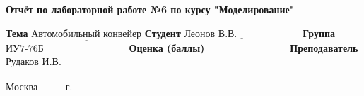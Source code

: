 \begin{titlepage}
	
	\begin{center}
		\Large\textbf{Отчёт по лабораторной работе №6 \newline по курсу "Моделирование"}\newline
	\end{center}
	
	\noindent\textbf{Тема} $\underline{\text{Автомобильный конвейер}}$\newline\newline\newline
	\noindent\textbf{Студент} $\underline{\text{Леонов В.В.~~~~~~~~~~~~~~~~~~~}}$\newline\newline
	\noindent\textbf{Группа} $\underline{\text{ИУ7-76Б~~~~~~~~~~~~~~~~~~~~~~~~~}}$\newline\newline
	\noindent\textbf{Оценка (баллы)} $\underline{\text{~~~~~~~~~~~~~~~~~~~~~~~~}}$\newline\newline
	\noindent\textbf{Преподаватель} $\underline{\text{Рудаков И.В. ~~~~~~}}$\newline
	
	\begin{center}
		\vfill
		Москва~---~\the\year
		~г.
	\end{center}
 \restoregeometry
\end{titlepage}
